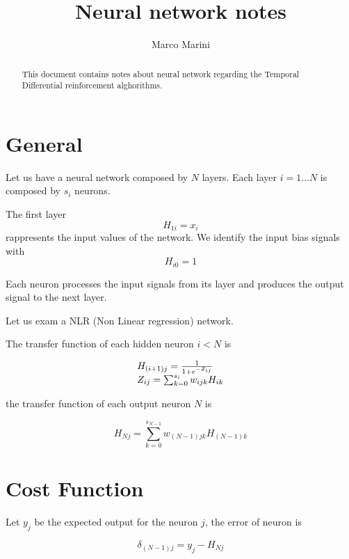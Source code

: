 \documentclass[a4paper,11pt]{article}
\title{Neural network notes}
\author{Marco Marini}
\begin{document}
\maketitle
\tableofcontents

\begin{abstract}
This document contains notes about neural network regarding the Temporal Differential reinforcement alghorithms.
\end{abstract}

\section{General}

Let us have a neural network composed by $ N $ layers. Each layer $ i = 1 \dots N $ is composed by $ s_i $ neurons.

The first layer
\[ H_{1i} = x_i \]
rappresents the input values of the network.
We identify the input bias signals with
\[ H_{i0} = 1 \]

Each neuron processes the input signals from its layer and produces the output signal to the next layer.

Let us exam a NLR (Non Linear regression) network.

The transfer function of each hidden neuron $ i < N $ is

\begin{equation}
\label{hidden}
  \begin{array}l
    H_{(i+1)j} = \frac{1}{1 + e^{-Z_{ij}}}
    \\
    Z_{ij} = \sum_{k=0}^{s_i} w_{ijk} H_{ik}
  \end{array}
\end{equation}

the transfer function of each output neuron $ N $ is

\begin{equation}
\label{nlr}
    H_{Nj} = \sum_{k=0}^{s_{N-1}} w_{(N-1)jk} H_{(N-1)k}
\end{equation}


\section{Cost Function}

Let $ y_j $ be the expected output for the neuron $ j $, the error of neuron is 

\begin{equation}
\label{delta}
  \delta_{(N-1)j} = y_j - H_{Nj}
\end{equation}
\end{document}

